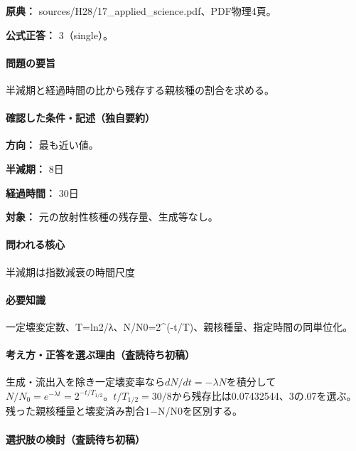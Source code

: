 \noindent\textbf{原典：} sources/H28/17\_applied\_science.pdf、PDF物理4頁。

\textbf{公式正答：} 3（single）。

\paragraph{問題の要旨} 半減期と経過時間の比から残存する親核種の割合を求める。

\paragraph{確認した条件・記述（独自要約）}\mbox{}\par

\noindent\textbf{方向：} 最も近い値。\par

\noindent\textbf{半減期：} 8日\par

\noindent\textbf{経過時間：} 30日\par

\noindent\textbf{対象：} 元の放射性核種の残存量、生成等なし。\par

\paragraph{問われる核心} 半減期は指数減衰の時間尺度

\paragraph{必要知識} 一定壊変定数、T=\allowbreak{}ln2/λ、N/N0=\allowbreak{}2\textasciicircum{}(-t/T)、親核種量、指定時間の同単位化。

\paragraph{考え方・正答を選ぶ理由（査読待ち初稿）} 生成・流出入を除き一定壊変率なら\(dN/dt=-\lambda N\)を積分して\(N/N_0=e^{-\lambda t}=2^{-t/T_{1/2}}\)。\(t/T_{1/2}=30/8\)から残存比は0.07432544、3の.07を選ぶ。残った親核種量と壊変済み割合1−N/N0を区別する。

\paragraph{選択肢の検討（査読待ち初稿）}\mbox{}\par

